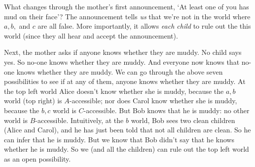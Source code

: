 What changes through the mother's first announcement, `At least one of you has
mud on their face'? The announcement tells \emph{us} that we're not in the
world where $a,b,$ and $c$ are all false. More importantly, it allows \emph{each child} to rule out the this world (since they all hear and accept the announcement).

\begin{center}
\end{center}

Next, the mother asks if anyone knows whether they are muddy. No child says yes.
So no-one knows whether they are muddy. And everyone now knows that no-one knows
whether they are muddy. We can go through the above seven possibilities to see
if at any of them, anyone knows whether they are muddy. At the top left world
Alice doesn't know whether she is muddy, because the $a,b$
world (top right) is $A$-accessible; nor does Carol know whether she is muddy,
because the $b,c$ world is $C$-accessible. But Bob knows that he is muddy: no other
world is $B$-accessible. Intuitively, at the $b$ world, Bob sees two
clean children (Alice and Carol), and he has just been told that not all
children are clean. So he can infer that he is muddy. But we know that Bob
didn't say that he knows whether he is muddy. So we (and all the children) can
rule out the top left world as an open possibility.

